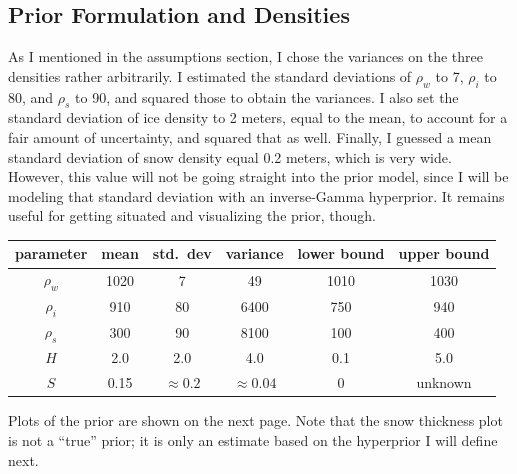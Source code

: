 \documentclass[12pt, letterpaper]{article}
\begin{document}
\subsection{Prior Formulation and Densities}
As I mentioned in the assumptions section, I chose the variances on the three densities rather arbitrarily.
I estimated the standard deviations of $\rho_w$ to 7, $\rho_i$ to 80, and $\rho_s$ to 90, and squared those to obtain the variances.
I also set the standard deviation of ice density to 2 meters, equal to the mean, to account for a fair amount of uncertainty, and squared that as well.
Finally, I guessed a mean standard deviation of snow density equal 0.2 meters, which is very wide. However, this value will not be going straight
into the prior model, since I will be modeling that standard deviation with an inverse-Gamma hyperprior. It remains useful for getting situated
and visualizing the prior, though.
\medskip
\begin{center}
\begin{tabular} { |c|c|c|c|c|c| }

\hline
parameter &  mean  & std.\ dev  & variance    & lower bound & upper bound \\
\hline
$\rho_w$  & 1020   &     7      &   49        &   1010      &    1030     \\
$\rho_i$  &  910   &    80      &   6400      &   750       &    940      \\
$\rho_s$  &  300   &    90      &   8100      &   100       &     400     \\
$H$       &  2.0   &    2.0     &   4.0       &   0.1       &    5.0      \\
$S$       &  0.15  &$\approx0.2$&$\approx0.04$&   0         &    unknown  \\
\hline

\end{tabular}
\end{center}
\medskip
Plots of the prior are shown on the next page. Note that the snow thickness plot is not a ``true'' prior; it is only an estimate
based on the hyperprior I will define next.
\end{document}
